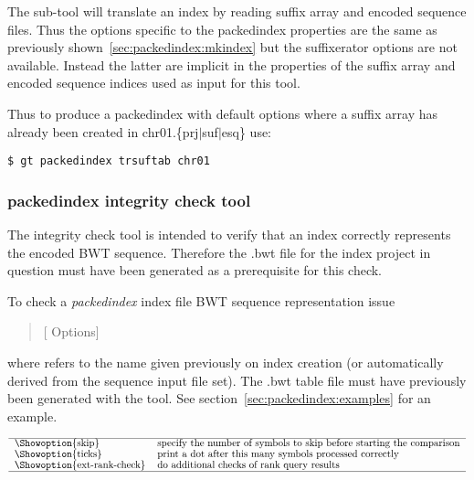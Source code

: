 \documentclass[12pt,titlepage]{article}
\newcommand{\packedindex}{\textit{packedindex}\xspace}
\begin{document}
The  sub-tool will translate an index by reading
suffix array and encoded sequence files. Thus the options specific to
the packedindex properties are the same as previously
shown~\ref{sec:packedindex:mkindex} but the suffixerator options are
not available. Instead the latter are implicit in the properties of
the suffix array and encoded sequence indices used as input for this
tool.

Thus to produce a packedindex with default options where a suffix
array has already been created in chr01.\{prj$|$suf$|$esq\} use:
\begin{footnotesize}
\begin{verbatim}
$ gt packedindex trsuftab chr01
\end{verbatim}
\end{footnotesize}

\subsubsection{packedindex integrity check tool}
\label{sec:packedindex:chkintegrity}

The integrity check tool is intended to verify that an index correctly
represents the encoded BWT sequence. Therefore the .bwt file for the
index project in question must have been generated as a prerequisite
for this check.

To check a \packedindex index file BWT sequence representation issue
\begin{quote}
  \ttfamily%
     [{\rmfamily
    Options}] 
\end{quote}

where  refers to the name given previously on index
creation (or automatically derived from the sequence input file set).
The .bwt table file must have previously been generated with the
 tool. See
section~\ref{sec:packedindex:examples} for an example.

\begin{table}[htbp]
\caption{Overview of the \packedindex {} options.}
\begin{footnotesize}
\[
\renewcommand{\arraystretch}{0.89}
\begin{tabular}{ll}\hline
\Showoption{skip}& specify the number of symbols to skip before
starting the comparison
\\
\Showoption{ticks}& print a dot after this many symbols processed correctly
\\
\Showoption{ext-rank-check}& do additional checks of rank query results
\\
\hline
\end{tabular}
%
\]
\end{footnotesize}
\label{tab:packedindex:chkintegrity:options}
\end{table}
\end{document}
